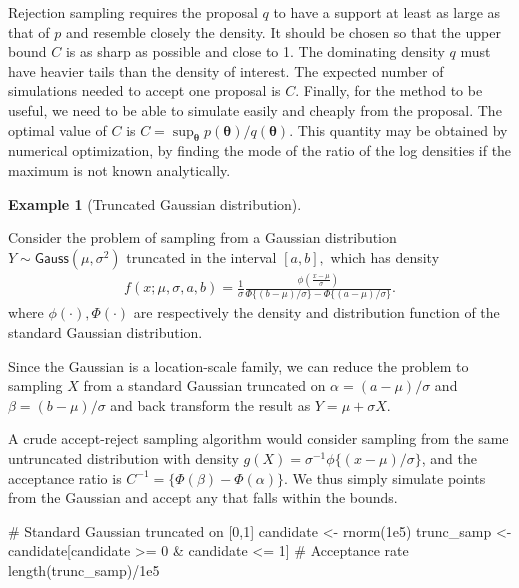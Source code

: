 \documentclass[
  11pt,
  letterpaper,
]{scrbook}
\newenvironment{Shaded}{\begin{snugshade}}{\end{snugshade}}
\newcommand{\CommentTok}[1]{\textcolor[rgb]{0.37,0.37,0.37}{#1}}
\newcommand{\DecValTok}[1]{\textcolor[rgb]{0.68,0.00,0.00}{#1}}
\newcommand{\FloatTok}[1]{\textcolor[rgb]{0.68,0.00,0.00}{#1}}
\newcommand{\FunctionTok}[1]{\textcolor[rgb]{0.28,0.35,0.67}{#1}}
\newcommand{\NormalTok}[1]{\textcolor[rgb]{0.00,0.23,0.31}{#1}}
\newcommand{\OtherTok}[1]{\textcolor[rgb]{0.00,0.23,0.31}{#1}}
\newcommand{\SpecialCharTok}[1]{\textcolor[rgb]{0.37,0.37,0.37}{#1}}
\theoremstyle{definition}
\theoremstyle{definition}
\newtheorem{example}{Example}[chapter]
\theoremstyle{definition}
\theoremstyle{plain}
\theoremstyle{plain}
\theoremstyle{remark}
\begin{document}
Rejection sampling requires the proposal \(q\) to have a support at
least as large as that of \(p\) and resemble closely the density. It
should be chosen so that the upper bound \(C\) is as sharp as possible
and close to 1. The dominating density \(q\) must have heavier tails
than the density of interest. The expected number of simulations needed
to accept one proposal is \(C.\) Finally, for the method to be useful,
we need to be able to simulate easily and cheaply from the proposal. The
optimal value of \(C\) is
\(C = \sup_{\boldsymbol{\theta}} p(\boldsymbol{\theta}) / q(\boldsymbol{\theta})\).
This quantity may be obtained by numerical optimization, by finding the
mode of the ratio of the log densities if the maximum is not known
analytically.

\begin{example}[Truncated Gaussian
distribution]\protect\hypertarget{exm-accept-reject-truncated}{}\label{exm-accept-reject-truncated}

Consider the problem of sampling from a Gaussian distribution
\(Y \sim \mathsf{Gauss}(\mu, \sigma^2)\) truncated in the interval
\([a, b],\) which has density \begin{align*}
f(x; \mu, \sigma, a, b) = \frac{1}{\sigma}\frac{\phi\left(\frac{x-\mu}{\sigma}\right)}{\Phi\{(b-\mu)/\sigma\}-\Phi\{(a-\mu)/\sigma\}}.
\end{align*} where \(\phi(\cdot), \Phi(\cdot)\) are respectively the
density and distribution function of the standard Gaussian distribution.

Since the Gaussian is a location-scale family, we can reduce the problem
to sampling \(X\) from a standard Gaussian truncated on
\(\alpha = (a-\mu)/\sigma\) and \(\beta = (b-\mu)/\sigma\) and back
transform the result as \(Y = \mu + \sigma X\).

A crude accept-reject sampling algorithm would consider sampling from
the same untruncated distribution with density
\(g(X) = \sigma^{-1}\phi\{(x-\mu)/\sigma\}\), and the acceptance ratio
is \(C^{-1}=\{\Phi(\beta) - \Phi(\alpha)\}\). We thus simply simulate
points from the Gaussian and accept any that falls within the bounds.

\begin{Shaded}
\begin{Highlighting}[]
\CommentTok{\# Standard Gaussian truncated on [0,1]}
\NormalTok{candidate }\OtherTok{\textless{}{-}} \FunctionTok{rnorm}\NormalTok{(}\FloatTok{1e5}\NormalTok{)}
\NormalTok{trunc\_samp }\OtherTok{\textless{}{-}}\NormalTok{ candidate[candidate }\SpecialCharTok{\textgreater{}=} \DecValTok{0} \SpecialCharTok{\&}\NormalTok{ candidate }\SpecialCharTok{\textless{}=} \DecValTok{1}\NormalTok{]}
\CommentTok{\# Acceptance rate}
\FunctionTok{length}\NormalTok{(trunc\_samp)}\SpecialCharTok{/}\FloatTok{1e5}
\end{Highlighting}
\end{Shaded}


\end{example}
\end{document}
